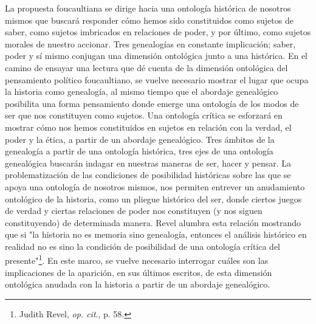 \documentclass{book}
\begin{document}
La propuesta foucaultiana se dirige hacia una ontología histórica de
nosotros mismos que buscará responder cómo hemos sido constituidos como
sujetos de saber, como sujetos imbricados en relaciones de poder, y por
último, como sujetos morales de nuestro accionar. Tres genealogías en
constante implicación; saber, poder y sí mismo conjugan una dimensión
ontológica junto a una histórica. En el camino de ensayar una lectura
que dé cuenta de la dimensión ontológica del pensamiento político
foucaultiano, se vuelve necesario mostrar el lugar que ocupa la historia
como genealogía, al mismo tiempo que el abordaje genealógico posibilita
una forma pensamiento donde emerge una ontología de los modos de ser que
nos constituyen como sujetos. Una ontología crítica se esforzará en
mostrar cómo nos hemos constituidos en sujetos en relación con la
verdad, el poder y la ética, a partir de un abordaje genealógico. Tres
ámbitos de la genealogía a partir de una ontología histórica, tres ejes
de una ontología genealógica buscarán indagar en nuestras maneras de
ser, hacer y pensar. La problematización de las condiciones de
posibilidad históricas sobre las que se apoya una ontología de nosotros
mismos, nos permiten entrever un anudamiento ontológico de la historia,
como un pliegue histórico del ser, donde ciertos juegos de verdad y
ciertas relaciones de poder nos constituyen (y nos siguen constituyendo)
de determinada manera. Revel alumbra esta relación mostrando que si "la
historia no es memoria sino genealogía, entonces el análisis histórico
en realidad no es sino la condición de posibilidad de una ontología
crítica del presente"\footnote{Judith Revel, \emph{op. cit}., p. 58.}.
En este marco, se vuelve necesario interrogar cuáles son las
implicaciones de la aparición, en sus últimos escritos, de esta
dimensión ontológica anudada con la historia a partir de un abordaje
genealógico.
\end{document}
